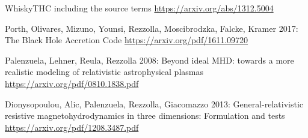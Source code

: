 \documentclass[a4paper]{article}
\begin{document}
\begin{thebibliography}{9}

  WhiskyTHC including the source terms
  \url{https://arxiv.org/abs/1312.5004}

  Porth, Olivares, Mizuno, Younsi, Rezzolla, Moscibrodzka, Falcke, Kramer 2017: The Black Hole Accretion Code
  \url{https://arxiv.org/pdf/1611.09720}

  Palenzuela, Lehner, Reula, Rezzolla 2008: 
  Beyond ideal MHD: towards a more realistic modeling of
  relativistic astrophysical plasmas
  \url{https://arxiv.org/pdf/0810.1838.pdf}
  
  Dionysopoulou, Alic, Palenzuela, Rezzolla, Giacomazzo 2013:
  General-relativistic resistive magnetohydrodynamics in
three dimensions: Formulation and tests
  \url{https://arxiv.org/pdf/1208.3487.pdf}

\end{thebibliography}
\end{document}
